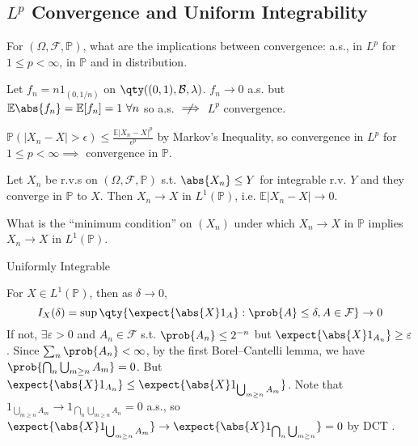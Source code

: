 \subsection{$L^p$ Convergence and Uniform Integrability}

For $(\Omega, \mathcal{F}, \mathbb{P})$, what are the implications between convergence: a.s., in $L^p$ for $1 \leq p < \infty$, in $\mathbb{P}$ and in distribution.

Let $f_n = n 1_{(0, 1/n)}$ on $\qty((0, 1), \mathcal{B}, \lambda)$.
$f_n \to 0$ a.s. but $\mathbb{E}\abs{f_n} = \mathbb{E}[f_n] = 1 \ \forall n$ so a.s. $\centernot\implies$ $L^p$ convergence.

$\mathbb{P}(|X_n - X| > \epsilon) \leq \frac{\mathbb{E}|X_n - X|^p}{\epsilon^p}$ by Markov's Inequality, so convergence in $L^p$ for $1 \leq p < \infty \implies$ convergence in $\mathbb{P}$.

\begin{theorem}
	Let $X_n$ be r.v.s on $(\Omega, \mathcal F, \mathbb P)$ s.t. $\abs{X_n} \leq Y$ for integrable r.v. $Y$ and they converge in $\mathbb{P}$ to $X$.
	Then $X_n \to X$ in $L^1(\mathbb P)$, i.e. $\mathbb{E}|X_n - X| \to 0$.
\end{theorem}

\begin{question}
	What is the ``minimum condition'' on $(X_n)$ under which $X_n \to X$ in $\mathbb{P}$ implies $X_n \to X$ in $L^1(\mathbb{P})$.
\end{question}

\begin{answer}
	Uniformly Integrable
\end{answer}


For $X \in L^1(\mathbb P)$, then as $\delta \to 0$,
\[ I_X(\delta) = \sup \qty{ \expect{\abs{X} 1_A} : \prob{A} \leq \delta, A \in \mathcal{F}} \to 0 \]
If not, $\exists \varepsilon > 0$ and $A_n \in \mathcal F$ s.t. $\prob{A_n} \leq 2^{-n}$ but $\expect{\abs{X} 1_{A_n}} \geq \varepsilon$.
Since $\sum_n \prob{A_n} < \infty$, by the first Borel--Cantelli lemma, we have $\prob{\bigcap_n \bigcup_{m \geq n} A_m} = 0$.
But $\expect{\abs{X} 1_{A_n}} \leq \expect{\abs{X} 1_{\bigcup_{m \geq n} A_m}}$.
Note that $1_{\bigcup_{m \geq n} A_m} \to 1_{\bigcap_n \bigcup_{m \geq n} A_n} = 0$ a.s., so $\expect{\abs{X} 1_{\bigcup_{m \geq n} A_m}} \to \expect{\abs{X} 1_{\bigcap_n \bigcup_{m \geq n}}} = 0$ by DCT \Lightning.


